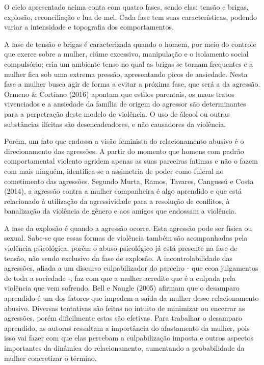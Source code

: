 O ciclo apresentado acima conta com quatro fases, sendo elas: tensão e brigas, explosão, reconciliação e lua de mel. Cada fase tem suas características, podendo variar a intensidade e topografia dos comportamentos.

A fase de tensão e brigas é caracterizada quando o homem, por meio do controle que exerce sobre a mulher, ciúme excessivo, manipulação e o isolamento social compulsório; cria um ambiente tenso no qual as brigas se tornam frequentes e a mulher fica sob uma extrema pressão, apresentando picos de ansiedade. Nesta fase a mulher busca agir de forma a evitar a próxima fase, que será a da agressão. Ormeno \& Cortiano (2016) apontam que estilos parentais, os maus tratos vivenciados e a ansiedade da família de origem do agressor são determinantes para a perpetração deste modelo de violência. O uso de álcool ou outras substâncias ilícitas são desencadeadores, e não causadores da violência.

Porém, um fato que endossa a visão feminista do relacionamento abusivo é o direcionamento das agressões. A partir do momento que homens com padrão comportamental violento agridem apenas as suas parceiras íntimas e não o fazem com mais ninguém, identifica-se a assimetria de poder como fulcral no cometimento das agressões. Segundo Murta, Ramos, Tavares, Cangussú e Costa (2014), a agressão contra a mulher companheira é algo aprendido e que está relacionado à utilização da agressividade para a resolução de conflitos, à banalização da violência de gênero e aos amigos que endossam a violência.

A fase da explosão é quando a agressão ocorre. Esta agressão pode ser física ou sexual. Sabe-se que essas formas de violência também são acompanhadas pela violência psicológica, porém o abuso psicológico já está presente na fase de tensão, não sendo exclusivo da fase de explosão. A incontrolabilidade das agressões, aliada a um discurso culpabilizador do parceiro - que ecoa julgamentos de toda a sociedade -, faz com que a mulher acredite que é a culpada pela violência que vem sofrendo. Bell e Naugle (2005) afirmam que o desamparo aprendido é um dos fatores que impedem a saída da mulher desse relacionamento abusivo. Diversas tentativas são feitas no intuito de minimizar ou encerrar as agressões, porém dificilmente estas são efetivas. Para trabalhar o desamparo aprendido, as autoras ressaltam a importância do afastamento da mulher, pois isso vai fazer com que elas percebam a culpabilização imposta e outros aspectos importantes da dinâmica do relacionamento, aumentando a probabilidade da mulher concretizar o término.

